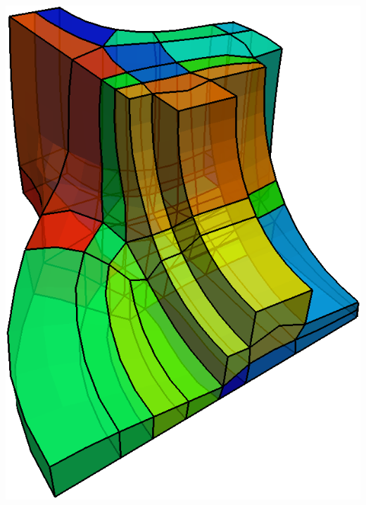 \documentclass[12pt]{beamer}
\begin{document}
\begin{frame}[fragile]
\begin{columns}
\begin{column}{0.5\textwidth}
      \includegraphics[width=\textwidth]{./images/ex2-base-complex.png}
    \end{column}
  \end{columns}
\end{frame}
\end{document}
